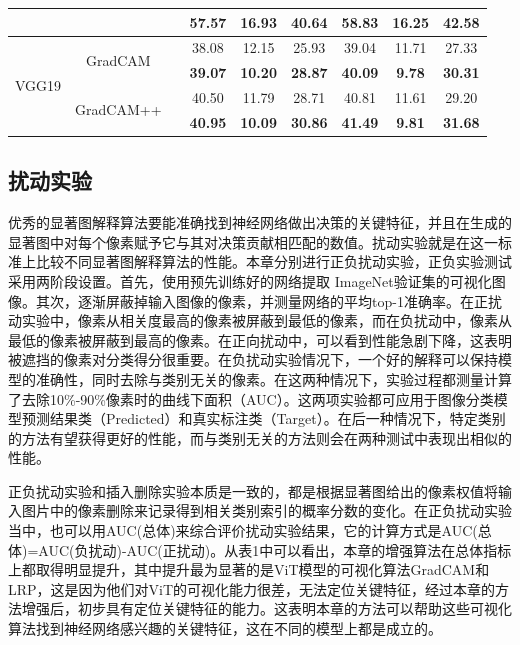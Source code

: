 \begin{table}[h!]
{\begin{tabular}{ccccccccc}
			&                                          & \checkmark                     & \textbf{57.57} & \textbf{16.93} & \textbf{40.64} & \textbf{58.83} & 16.25          & \textbf{42.58}  \\ 
			\hline
			\multirow{4}{*}{VGG19} & \multirow{2}{*}{GradCAM}                 &                       & 38.08          & 12.15          & 25.93          & 39.04          & 11.71          & 27.33           \\ 
			\cline{4-9}
			&                                          & \checkmark                     & \textbf{39.07} & \textbf{10.20} & \textbf{28.87} & \textbf{40.09} & \textbf{9.78}  & \textbf{30.31}  \\ 
			\cline{2-9}
			& \multirow{2}{*}{GradCAM++}               &                       & 40.50          & 11.79          & 28.71          & 40.81          & 11.61          & 29.20           \\ 
			\cline{4-9}
			&                                          & \checkmark                     & \textbf{40.95} & \textbf{10.09} & \textbf{30.86} & \textbf{41.49} & \textbf{9.81}  & \textbf{31.68}  \\
			\hline
		\end{tabular}
	}
\end{table}
\subsection{扰动实验}
优秀的显著图解释算法要能准确找到神经网络做出决策的关键特征，并且在生成的显著图中对每个像素赋予它与其对决策贡献相匹配的数值。扰动实验就是在这一标准上比较不同显著图解释算法的性能。本章分别进行正负扰动实验，正负实验测试采用两阶段设置。首先，使用预先训练好的网络提取 ImageNet验证集的可视化图像。其次，逐渐屏蔽掉输入图像的像素，并测量网络的平均top-1准确率。在正扰动实验中，像素从相关度最高的像素被屏蔽到最低的像素，而在负扰动中，像素从最低的像素被屏蔽到最高的像素。在正向扰动中，可以看到性能急剧下降，这表明被遮挡的像素对分类得分很重要。在负扰动实验情况下，一个好的解释可以保持模型的准确性，同时去除与类别无关的像素。在这两种情况下，实验过程都测量计算了去除10\%-90\%像素时的曲线下面积（AUC）。这两项实验都可应用于图像分类模型预测结果类（Predicted）和真实标注类（Target）。在后一种情况下，特定类别的方法有望获得更好的性能，而与类别无关的方法则会在两种测试中表现出相似的性能。

正负扰动实验和插入删除实验本质是一致的，都是根据显著图给出的像素权值将输入图片中的像素删除来记录得到相关类别索引的概率分数的变化。在正负扰动实验当中，也可以用AUC(总体)来综合评价扰动实验结果，它的计算方式是AUC(总体)=AUC(负扰动)-AUC(正扰动)。从表1中可以看出，本章的增强算法在总体指标上都取得明显提升，其中提升最为显著的是ViT模型的可视化算法GradCAM和LRP，这是因为他们对ViT的可视化能力很差，无法定位关键特征，经过本章的方法增强后，初步具有定位关键特征的能力。这表明本章的方法可以帮助这些可视化算法找到神经网络感兴趣的关键特征，这在不同的模型上都是成立的。

